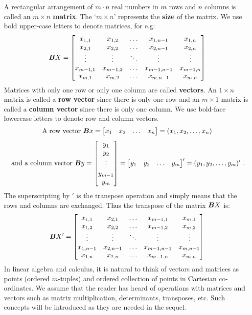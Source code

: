 A rectangular arrangement of $m \cdot n$ real numbers in $m$ rows and $n$ columns is called an $m \times n$ {\bf matrix}.  The `$m \times n$' represents the {\bf size} of the matrix.  We use bold upper-case letters to denote matrices, for e.g:
$$ 
\B{X} = \begin{bmatrix}
x_{1,1} & x_{1,2} & \ldots & x_{1,n-1} & x_{1,n} \\
x_{2,1} & x_{2,2} & \ldots & x_{2,n-1} & x_{2,n} \\
\vdots & \vdots & \ddots & \vdots & \vdots \\
x_{m-1,1} & x_{m-1,2} & \ldots & x_{m-1,n-1} & x_{m-1,n} \\
x_{m,1} & x_{m,2} & \ldots & x_{m,n-1} & x_{m,n} 
\end{bmatrix}
$$
Matrices with only one row or only one column are called {\bf vectors}.  An $1 \times n$ matrix is called a {\bf row vector} since there is only one row and an $m \times 1$ matrix is called a {\bf column vector} since there is only one column.  We use bold-face lowercase letters to denote row and column vectors.
$$ 
\text{A row vector } \B{x} = \begin{bmatrix}
x_{1} & x_{2} & \ldots & x_{n}
\end{bmatrix} = (x_1,x_2,\ldots,x_n)
$$
$$
\text{ and a column vector } \B{y} = 
\begin{bmatrix}
y_{1} \\
y_{2}  \\
\vdots \\
y_{m-1} \\
y_{m} 
\end{bmatrix}  
= \begin{bmatrix}
y_{1} & y_{2} & \ldots & y_{m}
\end{bmatrix}'
= (y_1,y_2,\ldots,y_m)' \ .
$$
The superscripting by $'$ is the transpose operation and simply means that the rows and columns are exchanged.  Thus the transpose of the matrix $\B{X}$ is:
$$ 
\B{X}' = \begin{bmatrix}
x_{1,1} & x_{2,1} & \ldots & x_{m-1,1} & x_{m,1} \\
x_{1,2} & x_{2,2} & \ldots & x_{m-1,2} & x_{m,2} \\
\vdots & \vdots & \ddots & \vdots & \vdots \\
x_{1,n-1} & x_{2,n-1} & \ldots & x_{m-1,n-1} & x_{m,n-1} \\
x_{1,n} & x_{2,n} & \ldots & x_{m-1,n} & x_{m,n} 
\end{bmatrix}
$$
In linear algebra and calculus, it is natural to think of vectors and matrices as points (ordered $m$-tuples) and ordered collection of points in Cartesian co-ordinates.  We assume that the reader has heard of operations with matrices and vectors such as matrix multiplication, determinants, transposes, etc.  Such concepts will be introduced as they are needed in the sequel.

